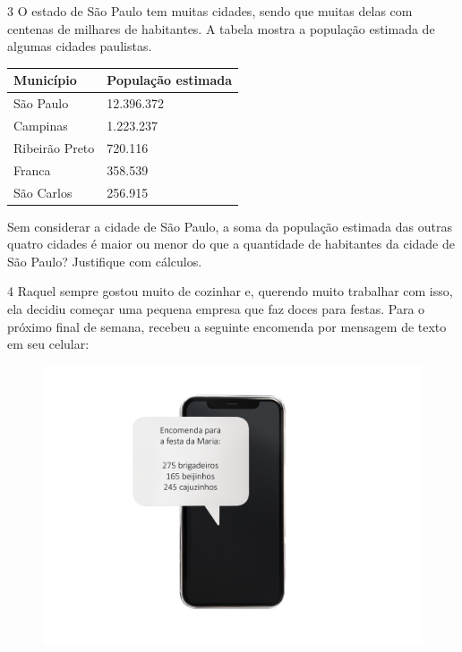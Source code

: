 

\num{3} O estado de São Paulo tem muitas cidades, sendo que muitas delas com
centenas de milhares de habitantes. A tabela mostra a população estimada
de algumas cidades paulistas.

\begin{longtable}[]{@{}ll@{}}
\toprule
Município & População estimada\tabularnewline
\midrule
\endhead
São Paulo & 12.396.372\tabularnewline
Campinas & 1.223.237\tabularnewline
Ribeirão Preto & 720.116\tabularnewline
Franca & 358.539\tabularnewline
São Carlos & 256.915\tabularnewline
\bottomrule
\end{longtable}


Sem considerar a cidade de São Paulo, a soma da população estimada das
outras quatro cidades é maior ou menor do que a quantidade de habitantes
da cidade de São Paulo? Justifique com cálculos.



\num{4} Raquel sempre gostou muito de cozinhar e,
querendo muito trabalhar com isso, ela decidiu começar uma pequena
empresa que faz doces para festas. Para o próximo final de semana, recebeu a seguinte encomenda por mensagem de texto em seu celular:

\begin{figure}[htpb!]
\includegraphics[width=\textwidth]{../ilustracoes/MAT5/SAEB_5ANO_MAT_figura18.png}
\end{figure}

